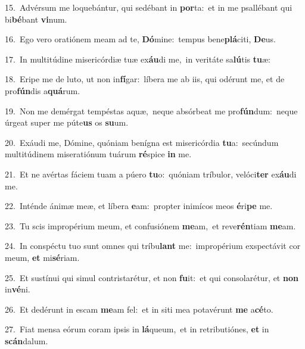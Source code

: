 {\numbfont\textcolor{\numbcolor}{15.}}~Advérsum me loquebántur, qui sedébant in \textbf{por}\-ta:~\star et in me psallébant qui bi\-\textbf{bé}\-bant \textbf{vi}\-num.\par
{\numbfont\textcolor{\numbcolor}{16.}}~Ego vero oratiónem meam ad te, \textbf{Dó}\-mine:~\star tempus bene\-\textbf{plá}\-citi, \textbf{De}\-us.\par
{\numbfont\textcolor{\numbcolor}{17.}}~In multitúdine misericórdiæ tuæ ex\-\textbf{áu}\-di me,~\star in veritáte sa\-\textbf{lú}\-tis \textbf{tu}\-æ:\par
{\numbfont\textcolor{\numbcolor}{18.}}~Eripe me de luto, ut non in\-\textbf{fí}\-gar:~\star líbera me ab iis, qui odérunt me, et de pro\-\textbf{fún}\-dis a\-\textbf{quá}\-rum.\par
{\numbfont\textcolor{\numbcolor}{19.}}~Non me demérgat tempéstas aquæ,~\dagger neque absórbeat me pro\-\textbf{fún}\-dum:~\star neque úrgeat super me púte\textbf{us} os \textbf{su}\-um.\par
{\numbfont\textcolor{\numbcolor}{20.}}~Exáudi me, Dómine, quóniam benígna est misericórdia \textbf{tu}\-a:~\star secúndum multitúdinem miseratiónum tuárum \textbf{ré}\-spice \textbf{in} me.\par
{\numbfont\textcolor{\numbcolor}{21.}}~Et ne avértas fáciem tuam a púero \textbf{tu}\-o:~\star quóniam tríbulor, velóci\textbf{ter} ex\-\textbf{áu}\-di me.\par
{\numbfont\textcolor{\numbcolor}{22.}}~Inténde ánimæ meæ, et líbera \textbf{e}\-am:~\star propter inimícos meos \textbf{é}\-ri\textbf{pe} me.\par
{\numbfont\textcolor{\numbcolor}{23.}}~Tu scis impropérium meum, et confusiónem \textbf{me}\-am,~\star et reve\-\textbf{rén}\-tiam \textbf{me}\-am.\par
{\numbfont\textcolor{\numbcolor}{24.}}~In conspéctu tuo sunt omnes qui tríbu\textbf{lant} me:~\star impropérium exspectávit cor meum, \textbf{et} mi\-\textbf{sé}\-riam.\par
{\numbfont\textcolor{\numbcolor}{25.}}~Et sustínui qui simul contristarétur, et non \textbf{fu}\-it:~\star et qui consolarétur, et \textbf{non} in\-\textbf{vé}\-ni.\par
{\numbfont\textcolor{\numbcolor}{26.}}~Et dedérunt in escam \textbf{me}\-am fel:~\star et in siti mea potavérunt \textbf{me} a\-\textbf{cé}\-to.\par
{\numbfont\textcolor{\numbcolor}{27.}}~Fiat mensa eórum coram ipsis in \textbf{lá}\-queum,~\star et in retributiónes, \textbf{et} in \textbf{scán}\-dalum.\par
